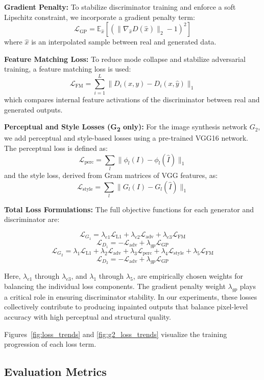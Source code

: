 \textbf{Gradient Penalty:}  
To stabilize discriminator training and enforce a soft Lipschitz constraint, we incorporate a gradient penalty term:
\[
\mathcal{L}_{\text{GP}} = \mathbb{E}_{\hat{x}} \left[ (\| \nabla_{\hat{x}} D(\hat{x}) \|_2 - 1)^2 \right]
\]
where \(\hat{x}\) is an interpolated sample between real and generated data.

\textbf{Feature Matching Loss:}  
To reduce mode collapse and stabilize adversarial training, a feature matching loss is used:
\[
\mathcal{L}_{\text{FM}} = \sum_{i=1}^{L} \| D_i(x, y) - D_i(x, \hat{y}) \|_1
\]
which compares internal feature activations of the discriminator between real and generated outputs.

\textbf{Perceptual and Style Losses (G\textsubscript{2} only):}  
For the image synthesis network \(G_2\), we add perceptual and style-based losses using a pre-trained VGG16 network. The perceptual loss is defined as:
\[
\mathcal{L}_{\text{perc}} = \sum_{l} \| \phi_l(I) - \phi_l(\hat{I}) \|_1
\]
and the style loss, derived from Gram matrices of VGG features, as:
\[
\mathcal{L}_{\text{style}} = \sum_l \| G_l(I) - G_l(\hat{I}) \|_1
\]

\textbf{Total Loss Formulations:}  
The full objective functions for each generator and discriminator are:

\[
\mathcal{L}_{G_1} = \lambda_{e1} \mathcal{L}_{\text{L1}} + \lambda_{e2} \mathcal{L}_{\text{adv}} + \lambda_{e3} \mathcal{L}_{\text{FM}}
\]
\[
\mathcal{L}_{D_1} = -\mathcal{L}_{\text{adv}} + \lambda_{gp} \mathcal{L}_{\text{GP}}
\]
\[
\mathcal{L}_{G_2} = \lambda_1 \mathcal{L}_{\text{L1}} + \lambda_2 \mathcal{L}_{\text{adv}} + \lambda_3 \mathcal{L}_{\text{perc}} + \lambda_4 \mathcal{L}_{\text{style}} + \lambda_5 \mathcal{L}_{\text{FM}}
\]
\[
\mathcal{L}_{D_2} = -\mathcal{L}_{\text{adv}} + \lambda_{gp} \mathcal{L}_{\text{GP}}
\]

Here, \(\lambda_{e1}\) through \(\lambda_{e3}\), and \(\lambda_1\) through \(\lambda_5\), are empirically chosen weights for balancing the individual loss components. The gradient penalty weight \(\lambda_{gp}\) plays a critical role in ensuring discriminator stability. In our experiments, these losses collectively contribute to producing inpainted outputs that balance pixel-level accuracy with high perceptual and structural quality.

Figures~\ref{fig:loss_trends} and \ref{fig:g2_loss_trends} visualize the training progression of each loss term.


\subsection{Evaluation Metrics}
\label{sec:evaluation}

